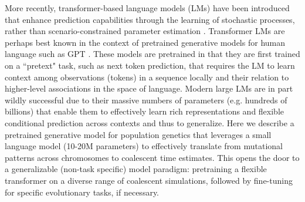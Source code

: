 \documentclass{article}
\let\citep\parencite
\begin{document}
More recently, transformer-based language models (LMs) have been introduced
that enhance prediction capabilities through the learning of stochastic processes,
rather than scenario-constrained parameter estimation \citep[e.g.][]{nait_saada_inference_2023}. 
Transformer LMs are perhaps best known in the context of pretrained generative models for human 
language such as GPT \citep{Radford2018ImprovingLU}. These models are pretrained in 
that they are first trained on a ``pretext" task, such as next token prediction, that 
requires the LM to learn context among observations (tokens) in a sequence locally
and their relation to higher-level associations in the space of language.
Modern large LMs are in part wildly successful due to their massive numbers of parameters (e.g. hundreds of billions) that enable them 
to effectively learn rich representations and flexible conditional prediction across contexts and thus to generalize.
Here we describe a pretrained generative model for population genetics that
leverages a small language model (10-20M parameters) to effectively translate from mutational patterns across chromosomes to coalescent time estimates. 
 This opens the door to a generalizable (non-task specific) model paradigm: pretraining a flexible transformer on a diverse range of coalescent simulations, followed by fine-tuning for specific evolutionary tasks, if necessary.
\end{document}
